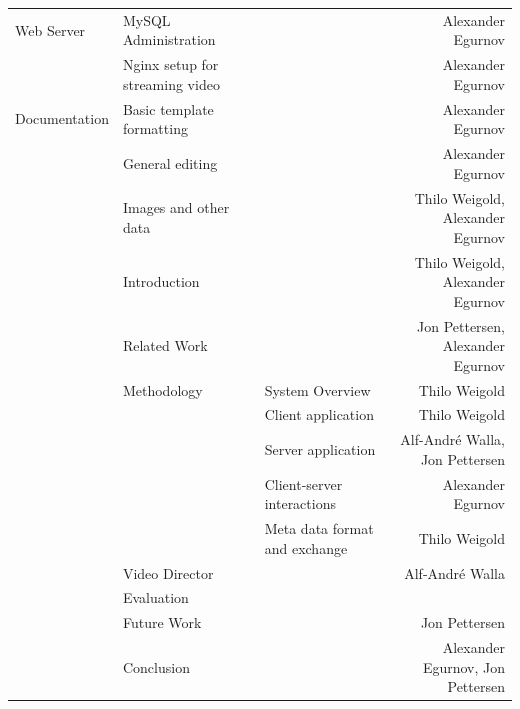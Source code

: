\documentclass[conference]{IEEEtran}
\begin{document}
\begin{table}[t]
\begin{tabular}{lllr}
		\midrule
		Web Server
			& MySQL Administration & & Alexander Egurnov \\
			& Nginx setup for streaming video & & Alexander Egurnov \\
		\midrule
		Documentation 
			& Basic template formatting & & Alexander Egurnov \\
			& General editing & & Alexander Egurnov \\
			& Images and other data & & Thilo Weigold, Alexander Egurnov \\
			& Introduction & & Thilo Weigold, Alexander Egurnov \\
			& Related Work & & Jon Pettersen, Alexander Egurnov \\
			& Methodology & System Overview & Thilo Weigold \\
			&		& Client application & Thilo Weigold \\
			&		& Server application & Alf-André Walla, Jon Pettersen \\
			&		& Client-server interactions & Alexander Egurnov \\
			&		& Meta data format and exchange & Thilo Weigold \\
			& Video Director & & Alf-André Walla \\
			& Evaluation & & \\
			& Future Work & & Jon Pettersen \\
			& Conclusion & & Alexander Egurnov, Jon Pettersen \\
		\bottomrule
    \end{tabular}%
\end{table}%

\vfill
\end{document}

